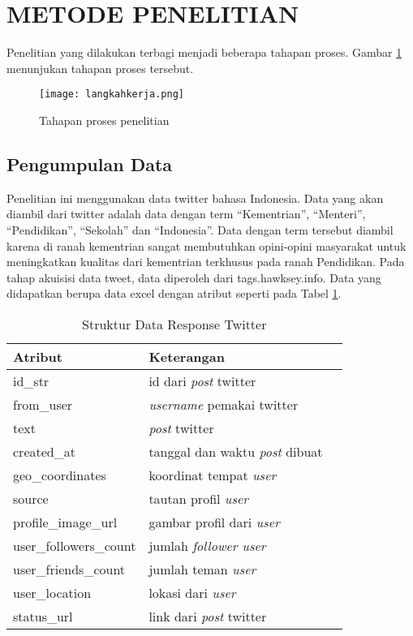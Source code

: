 
\section*{METODE PENELITIAN}

Penelitian yang dilakukan terbagi menjadi beberapa tahapan proses. Gambar \ref{fig:tahapan} menunjukan tahapan proses tersebut.

\begin{figure}[h!] %
	\centering
	\texttt{[image: langkahkerja.png]}
	\caption{Tahapan proses penelitian}
	\label{fig:tahapan}
\end{figure}

\subsection*{Pengumpulan Data}
Penelitian ini menggunakan data twitter bahasa Indonesia. Data yang akan diambil dari twitter adalah data dengan term “Kementrian”, “Menteri”, “Pendidikan”, “Sekolah” dan “Indonesia”. Data dengan term tersebut diambil karena di ranah kementrian sangat membutuhkan opini-opini masyarakat untuk meningkatkan kualitas dari kementrian terkhusus pada ranah Pendidikan. 
Pada tahap akuisisi data tweet, data diperoleh dari tags.hawksey.info. Data yang didapatkan berupa data excel dengan atribut seperti pada Tabel \ref{tab:strukturdatatwitter}.

\begin{table}[hbt]
	\caption{Struktur Data Response Twitter}
	\centering
	\begin{tabular}{llr}
		
		\cmidrule(r){1-2}
		Atribut & Keterangan \\
		\midrule
		id\_str & id dari \textit{post} twitter \\
		from\_user & \textit{username} pemakai twitter \\
		text & \textit{post} twitter \\
		created\_at & tanggal dan waktu \textit{post} dibuat \\
		geo\_coordinates & koordinat tempat \textit{user} \\
		source & tautan profil \textit{user} \\
		profile\_image\_url & gambar profil dari \textit{user} \\
		user\_followers\_count & jumlah \textit{follower user} \\
		user\_friends\_count & jumlah teman \textit{user} \\
		user\_location & lokasi dari \textit{user} \\
		status\_url & link dari \textit{post} twitter \\
		
		\bottomrule
	\end{tabular}
	\label{tab:strukturdatatwitter}
\end{table}

